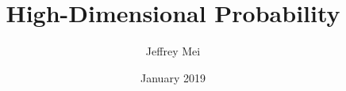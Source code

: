 \documentclass[12pt]{article}
\title{High-Dimensional Probability}
\author{Jeffrey Mei}
\date{January 2019}
\theoremstyle{break}
\begin{document}
\maketitle













\pagebreak


\end{document}
